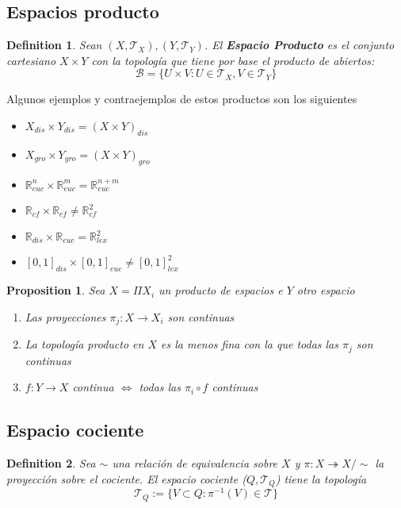 \documentclass{myclass}
\newtheorem*{definition}{Definition}
\newtheorem*{proposition}{Proposition}
\begin{document}
\subsection{Espacios producto}
\begin{definition}
Sean $(X, \mathcal{T}_X), (Y, \mathcal{T}_Y)$. El \textbf{Espacio Producto} es el conjunto cartesiano $X\times Y$ con la topología que tiene por base el producto de abiertos:
\[
\mathcal{B}=\{U\times V: U\in \mathcal{T}_X, V\in \mathcal{T}_Y\}
\] 
\end{definition}
Algunos ejemplos y contraejemplos de estos productos son los siguientes
\begin{itemize}[topsep=-6pt, itemsep=0pt]
  \item $X_{dis}\times Y_{dis} = (X\times Y)_{dis}$ 
  \item $X_{gro}\times Y_{gro}=(X\times Y)_{gro}$
  \item $\mathbb{R}^n_{euc}\times \mathbb{R}^m_{euc} = \mathbb{R}^{n+m}_{euc}$ 
  \item $\mathbb{R}_{cf}\times \mathbb{R}_{cf} \neq \mathbb{R}^2_{cf}$ 
  \item $\mathbb{R}_{dis}\times \mathbb{R}_{euc} = \mathbb{R}^2_{lex}$ 
  \item $[0,1]_{dis}\times [0, 1]_{euc} \neq  [0, 1]^2_{lex}$
\end{itemize}

\begin{proposition}
Sea $X = \Pi X_i$ un producto de espacios e $Y$ otro espacio
 \begin{enumerate}[topsep=-6pt, itemsep=0pt]
  \item Las proyecciones $\pi_j: X \to X_i$ son continuas
  \item La topología producto en $X$ es la menos fina con la que todas las $\pi_j$ son continuas
  \item  $f:Y\to X$ continua $\iff$ todas las $\pi_i\circ f$ continuas
\end{enumerate}
\end{proposition}

\subsection{Espacio cociente}
\begin{definition}
Sea $\sim $ una relación de equivalencia sobre $X$ y $\pi:X \twoheadrightarrow  X / \sim  $ la proyección sobre el cociente. El espacio cociente ($Q, \mathcal{T}_Q$) tiene la topología
\[
\mathcal{T}_{Q}:= \{V\subset Q:\pi^{-1}(V)\in \mathcal{T}\}
\] 
\end{definition}
\end{document}
